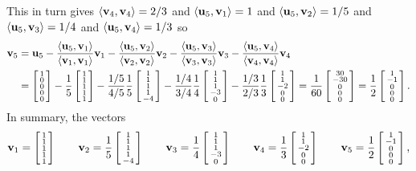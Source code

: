  This in turn gives $\ip{\vv_4,\vv_4}=2/3$ and $\ip{\vu_5,\vv_1}=1$
 and $\ip{\vu_5,\vv_2}=1/5$ and $\ip{\vu_5,\vv_3}=1/4$ and
 $\ip{\vu_5,\vv_4}=1/3$ so
 \begin{align*}
   \vv_5 &= \vu_5 - \frac{\ip{\vu_5,\vv_1}}{\ip{\vv_1,\vv_1}}\vv_1
              - \frac{\ip{\vu_5,\vv_2}}{\ip{\vv_2,\vv_2}}\vv_2
              - \frac{\ip{\vu_5,\vv_3}}{\ip{\vv_3,\vv_3}}\vv_3
              - \frac{\ip{\vu_5,\vv_4}}{\ip{\vv_4,\vv_4}}\vv_4 \\
   &= \bsm 1\\ 0\\ 0\\ 0\\ 0\esm
      - \frac{1}{5} \bsm 1\\1\\1\\1\\1 \esm
      - \frac{1/5}{4/5} \frac{1}{5} \bsm 1\\1\\1\\1\\-4 \esm
      - \frac{1/4}{3/4} \frac{1}{4} \bsm 1\\1\\1\\-3\\0 \esm
      - \frac{1/3}{2/3} \frac{1}{3} \bsm 1\\1\\-2\\0\\0 \esm
    = \frac{1}{60} \bsm 30\\ -30\\ 0\\ 0\\ 0\esm
    = \frac{1}{2} \bsm 1\\ -1\\ 0\\ 0\\ 0\esm .
 \end{align*}
 In summary, the vectors
 \[ \vv_1 = \bsm 1\\1\\1\\1\\1\esm \hspace{2em}
    \vv_2 = \frac{1}{5}\bsm 1\\1\\1\\1\\-4\esm \hspace{2em}
    \vv_3 = \frac{1}{4}\bsm 1\\1\\1\\-3\\0\esm \hspace{2em}
    \vv_4 = \frac{1}{3}\bsm 1\\1\\-2\\0\\0\esm \hspace{2em}
    \vv_5 = \frac{1}{2}\bsm 1\\-1\\0\\0\\0\esm,
 \]
